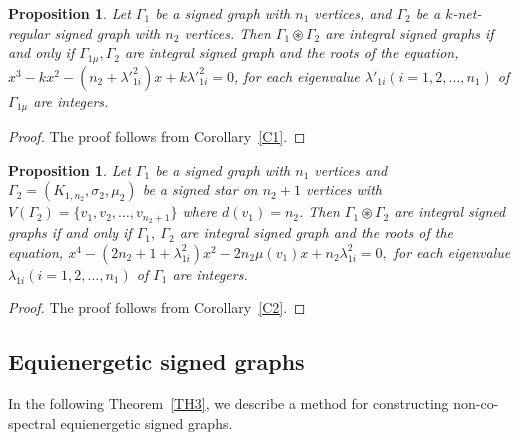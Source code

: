 \documentclass[12pt,a4paper]{article}
\newtheorem{prop}[theorem]{Proposition}
\theoremstyle{definition}
\theoremstyle{remark}
\begin{document}
    \begin{prop}
        Let $\Gamma_1$ be a signed graph with $n_1$ vertices, and $\Gamma_2$ be a $k$-net-regular signed graph with $n_2$ vertices. Then $\Gamma_1\circledast\Gamma_2$ are integral signed graphs if and only if $\Gamma_{1\mu}, \Gamma_2$ are integral signed graph and the roots of the equation, $x^3-kx^2-(n_2+{\lambda'}_{1i}^2)x+k{\lambda'}_{1i}^2=0$, for each eigenvalue ${\lambda'}_{1i}(i=1,2,\ldots,n_1)$ of $\Gamma_{1\mu}$ are integers.
    \end{prop}

    \begin{proof}
        The proof follows from Corollary~\ref{C1}.
    \end{proof}
    \begin{prop}
        Let $\Gamma_1$ be a signed graph with $n_1$ vertices and $\Gamma_2=(K_{1,n_2},\sigma_2,\mu_2)$ be a signed star on $n_2+1$ vertices with $V(\Gamma_2)=\{v_1,v_2,\ldots,v_{n_2+1}\}$ where $d(v_1)=n_2$. Then $\Gamma_1\circledast\Gamma_2$ are integral signed graphs if and only if $\Gamma_{1}, ~\Gamma_2$ are integral signed graph and the roots of the equation, $x^4-(2n_2+1+{\lambda}_{1i}^2)x^2-2n_2\mu(v_1)x+n_2{\lambda}_{1i}^2=0,$ for each eigenvalue ${\lambda}_{1i}(i=1,2,\ldots,n_1)$ of $\Gamma_{1}$ are integers.
    \end{prop}

    \begin{proof}
        The proof follows from Corollary~\ref{C2}.
    \end{proof}

    \subsection{Equienergetic signed graphs}
    In the following Theorem~\ref{TH3}, we describe a method for constructing non-co-spectral equienergetic signed graphs.
\end{document}
